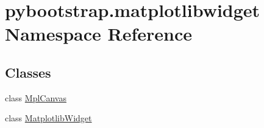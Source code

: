 \hypertarget{namespacepybootstrap_1_1matplotlibwidget}{\section{pybootstrap.\-matplotlibwidget Namespace Reference}
\label{namespacepybootstrap_1_1matplotlibwidget}
}
\subsection*{Classes}
\begin{DoxyCompactItemize}
\item 
class \hyperlink{classpybootstrap_1_1matplotlibwidget_1_1MplCanvas}{Mpl\-Canvas}
\item 
class \hyperlink{classpybootstrap_1_1matplotlibwidget_1_1MatplotlibWidget}{Matplotlib\-Widget}
\end{DoxyCompactItemize}
